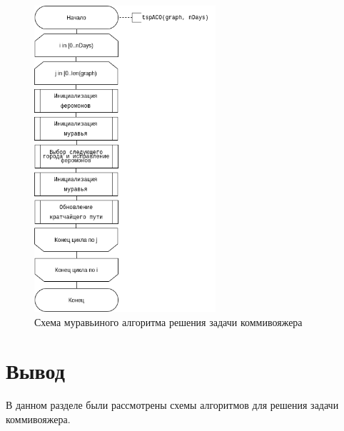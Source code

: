 \begin{figure}[h!]
    \centering
    \includegraphics[width=0.6\textwidth]{6/inc/d2.png}
    \caption{Схема муравьиного алгоритма решения задачи коммивояжера}
    \label{fig:2.2}
\end{figure}



\section{Вывод}
В данном разделе были рассмотрены схемы алгоритмов для решения задачи коммивояжера.